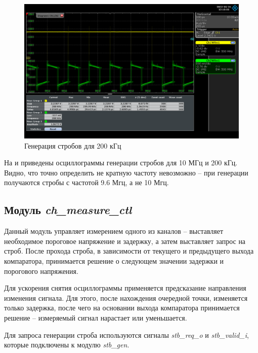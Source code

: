 \begin{figure}[ht!] 
	\center
	\includegraphics  [scale=0.3] {my_folder/images//stb_200khz}
	\caption{Генерация стробов для 200 кГц} 
	\label{fig:stb-200khz}  
\end{figure}

\FloatBarrier

На  и  приведены осциллограммы генерации стробов для 10 МГц и 200 кГц.
Видно, что точно определить не кратную частоту невозможно -- при генерации получаются стробы с частотой 9.6 Мгц, а не 10 Мгц.

\subsection{Модуль \emph{ch\_measure\_ctl}}

Данный модуль управляет измерением одного из каналов -- выставляет необходимое пороговое напряжение и задержку, а
затем выставляет запрос на строб. После прохода строба, в зависимости от текущего и предыдущего выхода компаратора, принимается решение
о следующем значении задержки и порогового напряжения.

Для ускорения снятия осциллограммы применяется предсказание направления изменения сигнала. Для этого, после нахождения очередной точки,
изменяется только задержка, после чего на основании выхода компаратора принимается решение -- измеряемый сигнал нарастает или уменьшается.

Для запроса генерации строба используются сигналы \emph{stb\_req\_o} и \emph{stb\_valid\_i}, которые подключены к модулю \emph{stb\_gen}.

